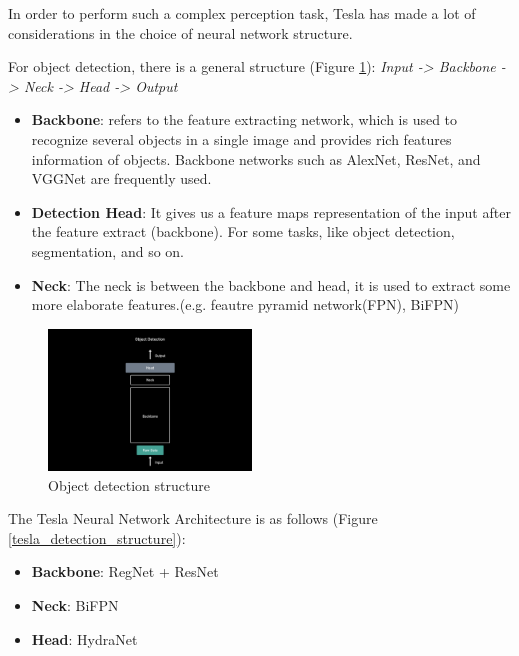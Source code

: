 \documentclass[letterpaper, 10 pt, conference]{ieeeconf}  %
\begin{document}
In order to perform such a complex perception task, Tesla has made a lot of considerations in the choice of neural network structure\cite{zhang_2021}.

For object detection, there is a general structure (Figure \ref{object_detection_structure}): \textit{Input -> Backbone -> Neck -> Head -> Output}

\begin{itemize}
    \item \textbf{Backbone}: refers to the feature extracting network, which is used to recognize several objects in a single image and provides rich features information of objects. Backbone networks such as AlexNet, ResNet, and VGGNet are frequently used.
    
    \item \textbf{Detection Head}: It gives us a feature maps representation of the input after the feature extract (backbone). For some tasks, like object detection, segmentation, and so on. 
    
    \item \textbf{Neck}: The neck is between the backbone and head, it is used to extract some more elaborate features.(e.g. feautre pyramid network(FPN), BiFPN)\cite{zhang_2021}
\end{itemize}

\begin{figure}[hbt!]
\centering
\includegraphics[width=0.48\textwidth]{gfx/object_detection_structure.png}
\caption{Object detection structure}
\label{object_detection_structure}
\end{figure}

The Tesla Neural Network Architecture is as follows (Figure \ref{tesla_detection_structure}): 

\begin{itemize}
    \item \textbf{Backbone}: RegNet + ResNet
    \item \textbf{Neck}: BiFPN
    \item \textbf{Head}: HydraNet
\end{itemize}
\end{document}
